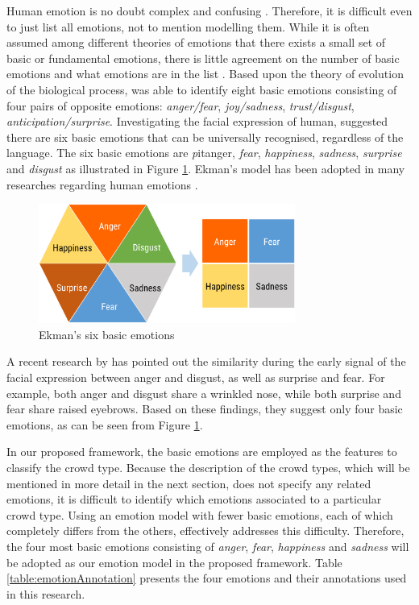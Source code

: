 Human emotion is no doubt complex and confusing \citep{plutchik2001nature}. Therefore, it is difficult even to just list all emotions, not to mention modelling them. While it is often assumed among different theories of emotions that there exists a small set of basic or fundamental emotions, there is little agreement on the number of basic emotions and what emotions are in the list \citep{Ortony1990}. Based upon the theory of evolution of the biological process, \citet{plutchik2001integration} was able to identify eight basic emotions consisting of four pairs of opposite emotions: \textit{anger/fear}, \textit{joy/sadness}, \textit{trust/disgust}, \textit{anticipation/surprise}. Investigating the facial expression of human, \citet{ekman1971constants} suggested there are six basic emotions that can be universally recognised, regardless of the language. The six basic emotions are \textit pit{anger}, \textit{fear}, \textit{happiness}, \textit{sadness}, \textit{surprise} and \textit{disgust} as illustrated in Figure \ref{fig:emotionModel}. Ekman's model has been adopted in many researches regarding human emotions \citep{mohammad2014using, roberts2012empatweet, alm2005emotions}. 

\begin{figure}[htb!]
\centering    
\includegraphics[width=0.75\textwidth]{EkmanModel}
\caption{Ekman's six basic emotions}
\label{fig:emotionModel}
\end{figure}

A recent research by \cite{Jack2014} has pointed out the similarity during the early signal of the facial expression between anger and disgust, as well as surprise and fear. For example, both anger and disgust share a wrinkled nose, while both surprise and fear share raised eyebrows. Based on these findings, they suggest only four basic emotions, as can be seen from Figure \ref{fig:emotionModel}.

In our proposed framework, the basic emotions are employed as the features to classify the crowd type. Because the description of the crowd types, which will be mentioned in more detail in the next section, does not specify any related emotions, it is difficult to identify which emotions associated to a particular crowd type. Using an emotion model with fewer basic emotions, each of which completely differs from the others, effectively addresses this difficulty. Therefore, the four most basic emotions consisting of \textit{anger}, \textit{fear}, \textit{happiness} and \textit{sadness} will be adopted as our emotion model in the proposed framework. Table \ref{table:emotionAnnotation} presents the four emotions and their annotations used in this research.

